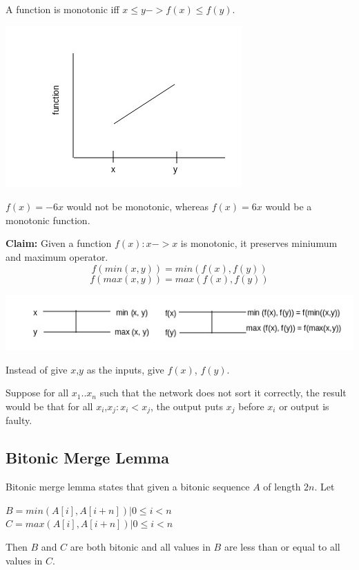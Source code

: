 \documentclass[twoside]{article}
\begin{document}
A function is monotonic iff $x\leq y -> f(x)\leq f(y)$.

\begin{center}
\includegraphics[scale=0.5]{g5}
\end{center}

$f(x) = -6x$ would not be monotonic, whereas $f(x) = 6x$ would be a monotonic function.

\textbf{Claim:} Given a function $f(x): x->x$ is monotonic, it preserves miniumum and maximum operator. 
$$f(min(x,y)) = min(f(x),f(y))$$
$$f(max(x,y)) = max(f(x),f(y))$$

\begin{center}
\includegraphics[scale=0.5]{g6}
\end{center}

Instead of give $x$,$y$ as the inputs, give $f(x)$, $f(y)$.

Suppose for all $x_1..x_n$ such that the network does not sort it correctly, the result would be that for all $x_i$,$x_j: x_i < x_j$, the output puts $x_j$ before $x_i$ or output is faulty.

\subsection{Bitonic Merge Lemma}
Bitonic merge lemma states that given a bitonic sequence $A$ of length $2n$. Let

$B = min(A[i],A[i+n]) |  0 \leq i < n$\\
$C = max(A[i],A[i+n]) |  0 \leq i < n$

Then $B$ and $C$ are both bitonic and all values in $B$ are less than or equal to all values in $C$. 
\end{document}
